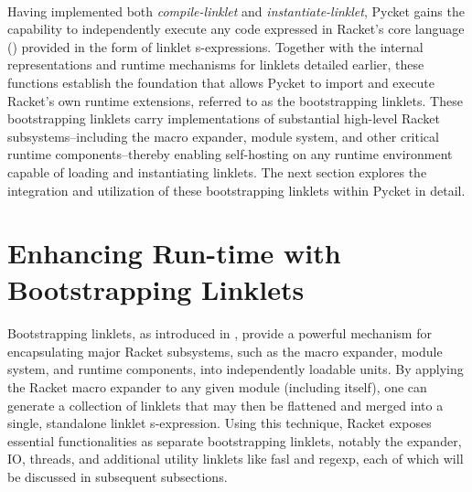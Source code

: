 		\paragraph{}%
			Having implemented both \emph{compile-linklet} and \emph{instantiate-linklet}, Pycket gains the capability to independently execute any code expressed in Racket's core language () provided in the form of linklet s-expressions. Together with the internal representations and runtime mechanisms for linklets detailed earlier, these functions establish the foundation that allows Pycket to import and execute Racket’s own runtime extensions, referred to as the bootstrapping linklets. These bootstrapping linklets carry implementations of substantial high-level Racket subsystems--including the macro expander, module system, and other critical runtime components--thereby enabling self-hosting on any runtime environment capable of loading and instantiating linklets. The next section explores the integration and utilization of these bootstrapping linklets within Pycket in detail.

	\section[\texorpdfstring{Enhancing Run-time with Bootstrapping Linklets}{Bootstrapping Linklets}]{Enhancing Run-time with Bootstrapping Linklets}

		\paragraph{}%
			Bootstrapping linklets, as introduced in , provide a powerful mechanism for encapsulating major Racket subsystems, such as the macro expander, module system, and runtime components, into independently loadable units. By applying the Racket macro expander to any given module (including itself), one can generate a collection of linklets that may then be flattened and merged into a single, standalone linklet s-expression. Using this technique, Racket exposes essential functionalities as separate bootstrapping linklets, notably the expander, IO, threads, and additional utility linklets like fasl and regexp, each of which will be discussed in subsequent subsections.


